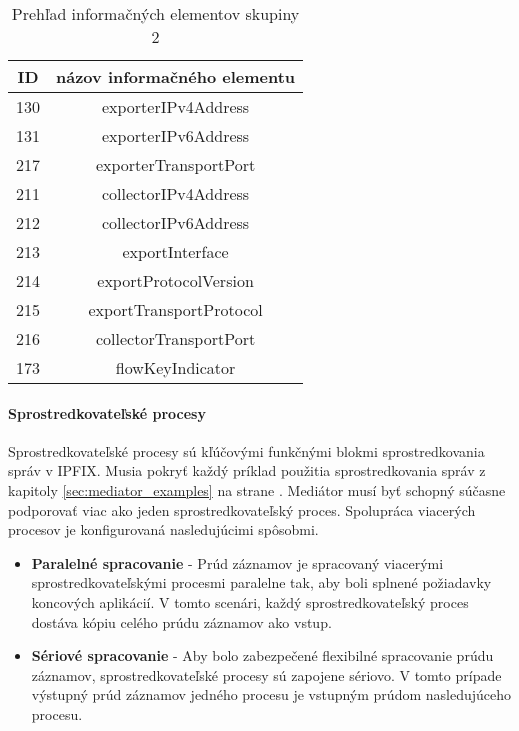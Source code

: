 \tabcolsep=8pt
\begin{table}[!ht]\caption{Prehľad informačných elementov skupiny 2}\label{t:ie-group2}
\smallskip
\centering
\begin{tabular}{|c|c|}
\hline
\textbf{ID} & \textbf{názov informačného elementu} \\ \hline
130 & exporterIPv4Address \\ \hline
131 & exporterIPv6Address \\ \hline
217 & exporterTransportPort \\ \hline
211 & collectorIPv4Address \\ \hline
212 & collectorIPv6Address \\ \hline
213 & exportInterface \\ \hline
214 & exportProtocolVersion \\ \hline
215 & exportTransportProtocol \\ \hline
216 & collectorTransportPort \\ \hline
173 & flowKeyIndicator \\ \hline
\end{tabular}
\end{table}

\paragraph{Sprostredkovateľské procesy} \label{sec:framework_intermediate}

Sprostredkovateľské procesy sú kľúčovými funkčnými blokmi sprostredkovania správ v IPFIX. Musia pokryť 
každý príklad použitia sprostredkovania správ z kapitoly \ref{sec:mediator_examples} na strane 
\pageref{sec:mediator_examples}. 
Mediátor musí byť schopný súčasne podporovať viac ako jeden sprostredkovateľský proces. Spolupráca viacerých 
procesov je konfigurovaná nasledujúcimi spôsobmi.

\begin{itemize}
 \item \textbf{Paralelné spracovanie} - Prúd záznamov je spracovaný viacerými sprostredkovateľskými procesmi 
 paralelne tak, aby boli splnené požiadavky koncových aplikácií. V tomto scenári, každý 
 sprostredkovateľský proces dostáva kópiu celého prúdu záznamov ako vstup.
 \item \textbf{Sériové spracovanie} - Aby bolo zabezpečené flexibilné spracovanie prúdu záznamov, sprostredkovateľské
 procesy sú zapojene sériovo. V tomto prípade výstupný prúd záznamov jedného procesu je vstupným prúdom 
 nasledujúceho procesu.
\end{itemize}






















